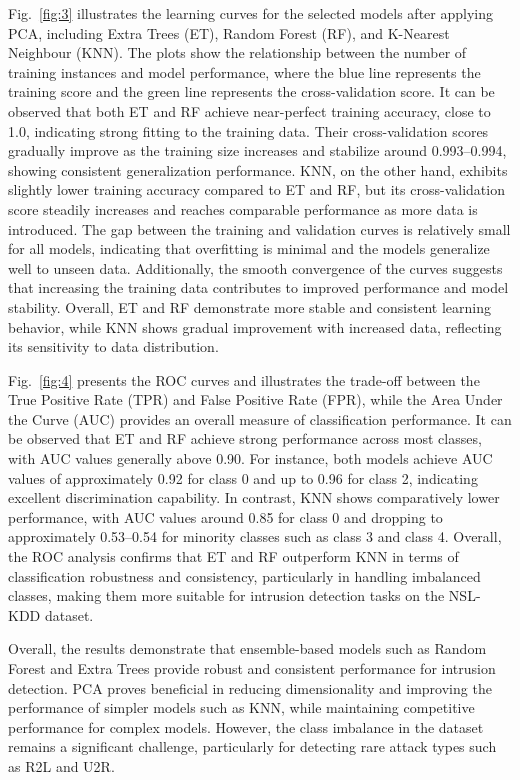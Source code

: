 \documentclass[conference]{IEEEtran}
\begin{document}
Fig.~\ref{fig:3} illustrates the learning curves for the selected models after applying PCA, including Extra Trees (ET), Random Forest (RF), and K-Nearest Neighbour (KNN). The plots show the relationship between the number of training instances and model performance, where the blue line represents the training score and the green line represents the cross-validation score. It can be observed that both ET and RF achieve near-perfect training accuracy, close to 1.0, indicating strong fitting to the training data. Their cross-validation scores gradually improve as the training size increases and stabilize around 0.993–0.994, showing consistent generalization performance. KNN, on the other hand, exhibits slightly lower training accuracy compared to ET and RF, but its cross-validation score steadily increases and reaches comparable performance as more data is introduced. The gap between the training and validation curves is relatively small for all models, indicating that overfitting is minimal and the models generalize well to unseen data. Additionally, the smooth convergence of the curves suggests that increasing the training data contributes to improved performance and model stability. Overall, ET and RF demonstrate more stable and consistent learning behavior, while KNN shows gradual improvement with increased data, reflecting its sensitivity to data distribution.

Fig.~\ref{fig:4} presents the ROC curves and illustrates the trade-off between the True Positive Rate (TPR) and False Positive Rate (FPR), while the Area Under the Curve (AUC) provides an overall measure of classification performance. It can be observed that ET and RF achieve strong performance across most classes, with AUC values generally above 0.90. For instance, both models achieve AUC values of approximately 0.92 for class 0 and up to 0.96 for class 2, indicating excellent discrimination capability. In contrast, KNN shows comparatively lower performance, with AUC values around 0.85 for class 0 and dropping to approximately 0.53–0.54 for minority classes such as class 3 and class 4. 
Overall, the ROC analysis confirms that ET and RF outperform KNN in terms of classification robustness and consistency, particularly in handling imbalanced classes, making them more suitable for intrusion detection tasks on the NSL-KDD dataset.

Overall, the results demonstrate that ensemble-based models such as Random Forest and Extra Trees provide robust and consistent performance for intrusion detection. PCA proves beneficial in reducing dimensionality and improving the performance of simpler models such as KNN, while maintaining competitive performance for complex models. However, the class imbalance in the dataset remains a significant challenge, particularly for detecting rare attack types such as R2L and U2R.
\end{document}
